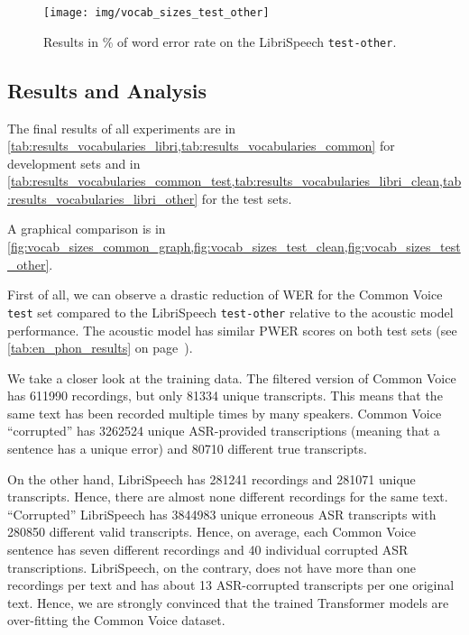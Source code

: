 \begin{figure}[p]
	\centering
	\texttt{[image: img/vocab\_sizes\_test\_other]}
	\caption[Results on the LibriSpeech \texttt{test-other}]{Results in \% of word error rate on the LibriSpeech \texttt{test-other}.}
	\label{fig:vocab_sizes_test_other}
\end{figure}



\subsection{Results and Analysis}

The final results of all experiments are in \cref{tab:results_vocabularies_libri,tab:results_vocabularies_common} for development sets and in \cref{tab:results_vocabularies_common_test,tab:results_vocabularies_libri_clean,tab:results_vocabularies_libri_other} for the test sets.

A graphical comparison is in \cref{fig:vocab_sizes_common_graph,fig:vocab_sizes_test_clean,fig:vocab_sizes_test_other}.

First of all, we can observe a drastic reduction of WER for the Common Voice \texttt{test} set compared to the LibriSpeech \texttt{test-other} relative to the acoustic model performance. The acoustic model has similar PWER scores on both test sets (see \cref{tab:en_phon_results} on page~\pageref{tab:en_phon_results}). 

We take a closer look at the training data. The filtered version of Common Voice has 611990 recordings, but only 81334 unique transcripts. This means that the same text has been recorded multiple times by many speakers. Common Voice ``corrupted'' has 3262524 unique ASR-provided transcriptions (meaning that a sentence has a unique error) and 80710 different true transcripts.

On the other hand, LibriSpeech has 281241 recordings and 281071 unique transcripts. Hence, there are almost none different recordings for the same text. ``Corrupted'' LibriSpeech has 3844983 unique erroneous ASR transcripts with 280850 different valid transcripts. Hence, on average, each Common Voice sentence has seven different recordings and 40 individual corrupted ASR transcriptions. LibriSpeech, on the contrary, does not have more than one recordings per text and has about 13 ASR-corrupted transcripts per one original text. Hence, we are strongly convinced that the trained Transformer models are over-fitting the Common Voice dataset.

